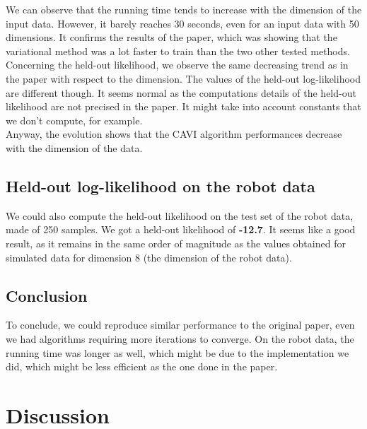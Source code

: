 \documentclass{article}
\begin{document}
We can observe that the running time tends to increase with the dimension of the input data. However, it barely reaches 30 seconds, even for an input data with 50 dimensions. It confirms the results of the paper, which was showing that the variational method was a lot faster to train than the two other tested methods. \\
Concerning the held-out likelihood, we observe the same decreasing trend as in the paper with respect to the dimension. The values of the held-out log-likelihood are different though. It seems normal as the computations details of the held-out likelihood are not precised in the paper. It might take into account constants that we don't compute, for example.\\
Anyway, the evolution shows that the CAVI algorithm performances decrease with the dimension of the data. \\

\subsection{Held-out log-likelihood on the robot data}
We could also compute the held-out likelihood on the test set of the robot data, made of 250 samples. We got a held-out likelihood of \textbf{-12.7}. It seems like a good result, as it remains in the same order of magnitude as the values obtained for simulated data for dimension 8 (the dimension of the robot data).


\subsection{Conclusion}
To conclude, we could reproduce similar performance to the original paper, even we had algorithms requiring more iterations to converge. On the robot data, the running time was longer as well, which might be due to the implementation we did, which might be less efficient as the one done in the paper.


\section{Discussion}
\end{document}
